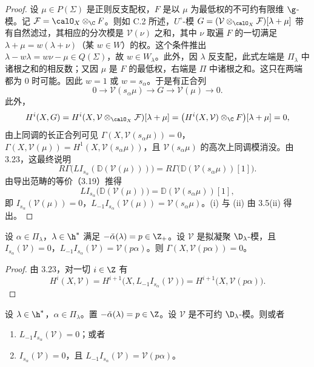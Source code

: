 \begin{proof}
设 $\mu\in P(\Sigma)$ 是正则反支配权，$F$ 是以 $\mu$ 为最低权的不可约有限维 $\g$-模。记 $\mathcal{F}=\calO_X\otimes_\C F$。则如 C.2 所述，$U^\circ$-模 $G=(\mathcal{V}\otimes_{\calO_X}\mathcal{F})[\lambda+\mu]$ 带有自然滤过，其相应的分次模是 $\mathcal{V}(\nu)$ 之和，其中 $\nu$ 取遍 $F$ 的一切满足 $\lambda+\mu=w(\lambda+\nu)$（某 $w\in W$）的权。这个条件推出 $\lambda-w\lambda=w\nu-\mu\in Q(\Sigma)$，故 $w\in W_\lambda$。此外，因 $\lambda$ 反支配，此式左端是 $\Pi_\lambda$ 中诸根之和的相反数；又因 $\mu$ 是 $F$ 的最低权，右端是 $\Pi$ 中诸根之和。这只在两端都为 $0$ 时可能。因此 $w=1$ 或 $w=s_\alpha$。于是有正合列
$$0\longrightarrow\mathcal{V}(s_\alpha\mu)\longrightarrow G\longrightarrow\mathcal{V}(\mu)\longrightarrow 0.$$
此外，
$$H^i(X,G)=H^i(X,\mathcal{V}\otimes_{\calO_X}\mathcal{F})[\lambda+\mu]=\bigl(H^i(X,\mathcal{V})\otimes_\C F\bigr)[\lambda+\mu]=0,$$
由上同调的长正合列可见 $\Gamma(X,\mathcal{V}(s_\alpha\mu))=0$，$\Gamma(X,\mathcal{V}(\mu))=H^1(X,\mathcal{V}(s_\alpha\mu))$，且 $\mathcal{V}(s_\alpha\mu)$ 的高次上同调模消没。由 3.23，这最终说明
$$R\Gamma\bigl(LI_{s_\alpha}(\mathbb{D}(\mathcal{V}(\mu)))\bigr)=R\Gamma\bigl(\mathbb{D}(\mathcal{V}(s_\alpha\mu))[1]\bigr).$$
由导出范畴的等价（3.19）推得
$$LI_{s_\alpha}\bigl(\mathbb{D}(\mathcal{V}(\mu))\bigr)=\mathbb{D}(\mathcal{V}(s_\alpha\mu))[1],$$
即 $I_{s_\alpha}(\mathcal{V}(\mu))=0$，$L_{-1}I_{s_\alpha}(\mathcal{V}(\mu))=\mathcal{V}(s_\alpha\mu)$。(i) 与 (ii) 由 3.5(ii) 得出。
\end{proof}

\begin{lemma}\label{lem:03.5.5}
设 $\alpha\in\Pi_\lambda$，$\lambda\in\h^*$ 满足 $-\check{\alpha}(\lambda)=p\in\Z_+$。设 $\mathcal{V}$ 是拟凝聚 $\D_\lambda$-模，且 $I_{s_\alpha}(\mathcal{V})=0$，$L_{-1}I_{s_\alpha}(\mathcal{V})=\mathcal{V}(p\alpha)$。则 $\Gamma(X,\mathcal{V}(p\alpha))=0$。
\end{lemma}

\begin{proof}
由 3.23，对一切 $i\in\Z$ 有
$$H^i(X,\mathcal{V})=H^{i+1}\bigl(X,L_{-1}I_{s_\alpha}(\mathcal{V})\bigr)=H^{i+1}\bigl(X,\mathcal{V}(p\alpha)\bigr).$$
\end{proof}

\begin{lemma}\label{lem:03.5.6}
设 $\lambda\in\h^*$，$\alpha\in\Pi_\lambda$。置 $-\check{\alpha}(\lambda)=p\in\Z$。设 $\mathcal{V}$ 是不可约 $\D_\lambda$-模。则或者
\begin{enumerate}[label=(\roman*)]
\item $L_{-1}I_{s_\alpha}(\mathcal{V})=0$；或者
\item $I_{s_\alpha}(\mathcal{V})=0$，且 $L_{-1}I_{s_\alpha}(\mathcal{V})=\mathcal{V}(p\alpha)$。
\end{enumerate}
\end{lemma}

